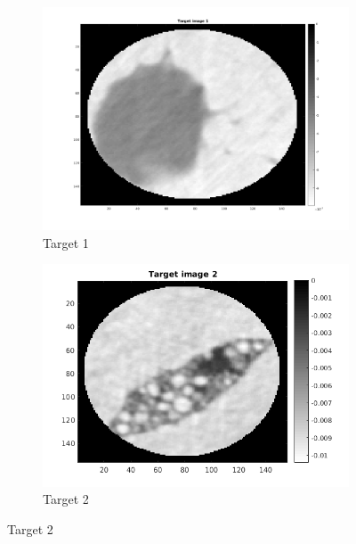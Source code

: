 \documentclass[10pt,a4paper,titlepage]{article}
\begin{document}
		\begin{figure}[H]
		
       		\centering
      		\begin{subfigure}[b]{0.32\textwidth}
            	\centering
            	\includegraphics[width=\textwidth]{Sample1/target1.png}
            	\caption{Target 1}    
            	\label{subfig:Target1Fully}
        	\end{subfigure}
        	\hfill
        	\begin{subfigure}[b]{0.32\textwidth}  
            	\centering 
            	\includegraphics[width=\textwidth]{Sample2/target2.png}
            	\caption{Target 2}    
            	\label{subfig:FBP1Fully}
        	\end{subfigure}
        	\hfill

\end{figure}
\end{document}
